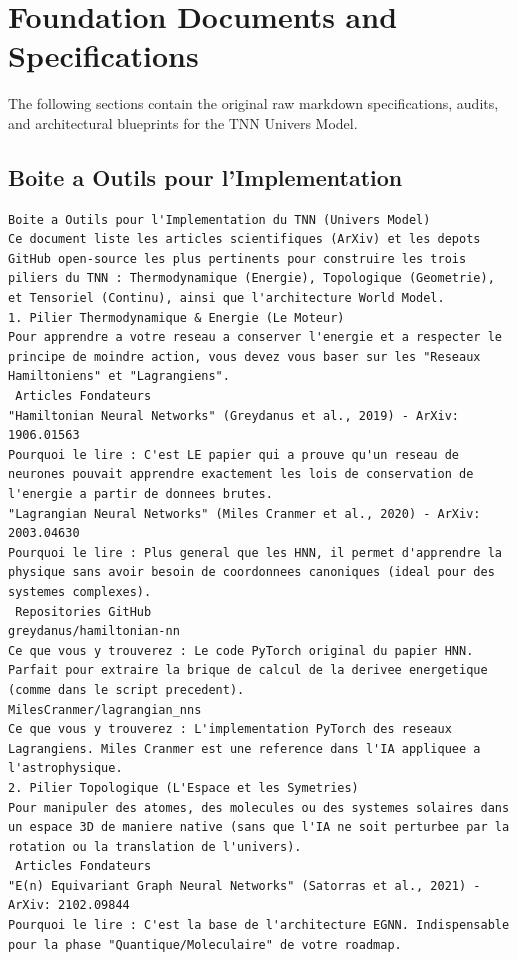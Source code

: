 \documentclass[11pt,a4paper]{article}
\begin{document}
\newpage
\appendix
\section{Foundation Documents and Specifications}
The following sections contain the original raw markdown specifications, audits, and architectural blueprints for the TNN Univers Model.

\subsection{ Boite a Outils pour l'Implementation}
\begin{lstlisting}[language={}, caption={}, basicstyle=\ttfamily\footnotesize, breaklines=true]
 Boite a Outils pour l'Implementation du TNN (Univers Model)
Ce document liste les articles scientifiques (ArXiv) et les depots GitHub open-source les plus pertinents pour construire les trois piliers du TNN : Thermodynamique (Energie), Topologique (Geometrie), et Tensoriel (Continu), ainsi que l'architecture World Model.
1. Pilier Thermodynamique & Energie (Le Moteur)
Pour apprendre a votre reseau a conserver l'energie et a respecter le principe de moindre action, vous devez vous baser sur les "Reseaux Hamiltoniens" et "Lagrangiens".
 Articles Fondateurs
"Hamiltonian Neural Networks" (Greydanus et al., 2019) - ArXiv: 1906.01563
Pourquoi le lire : C'est LE papier qui a prouve qu'un reseau de neurones pouvait apprendre exactement les lois de conservation de l'energie a partir de donnees brutes.
"Lagrangian Neural Networks" (Miles Cranmer et al., 2020) - ArXiv: 2003.04630
Pourquoi le lire : Plus general que les HNN, il permet d'apprendre la physique sans avoir besoin de coordonnees canoniques (ideal pour des systemes complexes).
 Repositories GitHub
greydanus/hamiltonian-nn
Ce que vous y trouverez : Le code PyTorch original du papier HNN. Parfait pour extraire la brique de calcul de la derivee energetique (comme dans le script precedent).
MilesCranmer/lagrangian_nns
Ce que vous y trouverez : L'implementation PyTorch des reseaux Lagrangiens. Miles Cranmer est une reference dans l'IA appliquee a l'astrophysique.
2. Pilier Topologique (L'Espace et les Symetries)
Pour manipuler des atomes, des molecules ou des systemes solaires dans un espace 3D de maniere native (sans que l'IA ne soit perturbee par la rotation ou la translation de l'univers).
 Articles Fondateurs
"E(n) Equivariant Graph Neural Networks" (Satorras et al., 2021) - ArXiv: 2102.09844
Pourquoi le lire : C'est la base de l'architecture EGNN. Indispensable pour la phase "Quantique/Moleculaire" de votre roadmap.

\end{lstlisting}
\end{document}
